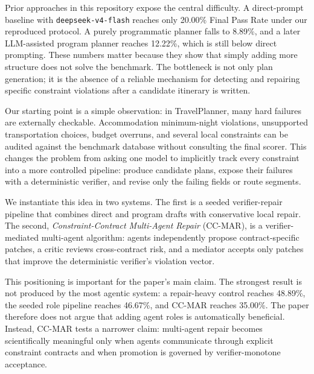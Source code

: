 \documentclass{article}
\begin{document}
Prior approaches in this repository expose the central difficulty. A direct-prompt baseline with \texttt{deepseek-v4-flash} reaches only 20.00\% Final Pass Rate under our reproduced protocol. A purely programmatic planner falls to 8.89\%, and a later LLM-assisted program planner reaches 12.22\%, which is still below direct prompting. These numbers matter because they show that simply adding more structure does not solve the benchmark. The bottleneck is not only plan generation; it is the absence of a reliable mechanism for detecting and repairing specific constraint violations after a candidate itinerary is written.

Our starting point is a simple observation: in TravelPlanner, many hard failures are externally checkable. Accommodation minimum-night violations, unsupported transportation choices, budget overruns, and several local constraints can be audited against the benchmark database without consulting the final scorer. This changes the problem from asking one model to implicitly track every constraint into a more controlled pipeline: produce candidate plans, expose their failures with a deterministic verifier, and revise only the failing fields or route segments.

We instantiate this idea in two systems. The first is a seeded verifier-repair pipeline that combines direct and program drafts with conservative local repair. The second, \emph{Constraint-Contract Multi-Agent Repair} (CC-MAR), is a verifier-mediated multi-agent algorithm: agents independently propose contract-specific patches, a critic reviews cross-contract risk, and a mediator accepts only patches that improve the deterministic verifier's violation vector.

This positioning is important for the paper's main claim. The strongest result is not produced by the most agentic system: a repair-heavy control reaches 48.89\%, the seeded role pipeline reaches 46.67\%, and CC-MAR reaches 35.00\%. The paper therefore does not argue that adding agent roles is automatically beneficial. Instead, CC-MAR tests a narrower claim: multi-agent repair becomes scientifically meaningful only when agents communicate through explicit constraint contracts and when promotion is governed by verifier-monotone acceptance.
\end{document}
